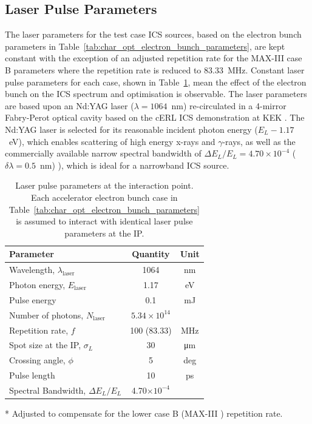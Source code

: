 \documentclass[../main.tex]{subfiles}
\begin{document}
\subsection{Laser Pulse Parameters}

The laser parameters for the test case ICS sources, based on the electron bunch parameters in Table~\ref{tab:char_opt_electron_bunch_parameters}, are kept constant with the exception of an adjusted repetition rate for the MAX-III case B parameters where the repetition rate is reduced to 83.33~\si{\mega\hertz}. Constant laser pulse parameters for each case, shown in Table~\ref{tab:char_opt_laser_pulse_parameters}, mean the effect of the electron bunch on the ICS spectrum and optimisation is observable. The laser parameters are based upon an Nd:YAG laser ($\lambda = 1064$~\si{\nano\meter}) re-circulated in a 4-mirror Fabry-Perot optical cavity based on the cERL ICS demonstration at KEK \cite{akagi2016narrow}. The Nd:YAG laser is selected for its reasonable incident photon energy ($E_{L}-1.17$~\si{\electronvolt}), which enables scattering of high energy x-rays and $\gamma$-rays, as well as the commercially available narrow spectral bandwidth of $\Delta E_{L}/E_{L} = 4.70\times 10^{-4}$  ($\delta\lambda = 0.5$~\si{\nano\meter}) \cite{thorlabs2021ndyag200}), which is ideal for a narrowband ICS source.

\begin{table}[!h]
\centering
\caption{Laser pulse parameters at the interaction point. Each accelerator electron bunch case in Table~\ref{tab:char_opt_electron_bunch_parameters} is assumed to interact with identical laser pulse parameters at the IP.}
\begin{threeparttable}
\begin{tabular}{lcc}
\hline\hline
Parameter & Quantity & Unit \\
\hline
Wavelength, $\lambda_\textrm{laser}$ & 1064 & nm\\
Photon energy, $E_\textrm{laser}$ & 1.17 & eV\\
Pulse energy  & 0.1 & \si{\milli\joule}\\
Number of photons, $N_{\textrm{laser}}$ & $5.34\times 10^{14}$\\ 
Repetition rate, $f$ & 100 (83.33)\tnote{*} & MHz\\
Spot size at the IP, $\sigma_{L}$ & 30 & \si{\micro\meter}\\
Crossing angle, $\phi$ & 5 & deg \\
Pulse length  & 10 & ps\\
Spectral Bandwidth, $\Delta E_{L}/E_{L}$ & 4.70$\times 10^{-4}$ &   \\
\hline\hline
\end{tabular}
\begin{tablenotes}
\item[*]{Adjusted to compensate for the lower case B (MAX-III \cite{sjostrom2009max,rosborg2012electron}) repetition rate.}
\end{tablenotes}
\end{threeparttable}
\label{tab:char_opt_laser_pulse_parameters}
\end{table}
\end{document}

